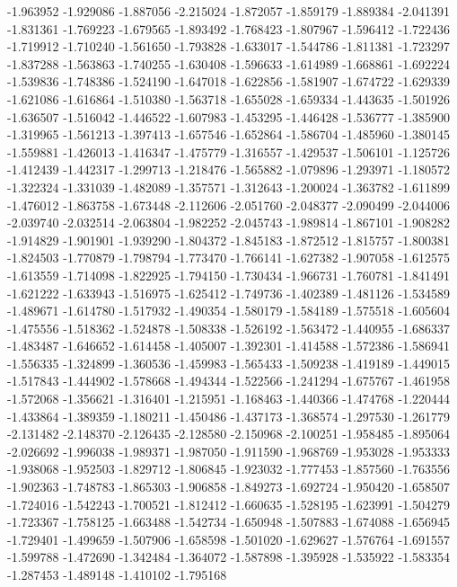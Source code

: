 -1.963952
-1.929086
-1.887056
-2.215024
-1.872057
-1.859179
-1.889384
-2.041391
-1.831361
-1.769223
-1.679565
-1.893492
-1.768423
-1.807967
-1.596412
-1.722436
-1.719912
-1.710240
-1.561650
-1.793828
-1.633017
-1.544786
-1.811381
-1.723297
-1.837288
-1.563863
-1.740255
-1.630408
-1.596633
-1.614989
-1.668861
-1.692224
-1.539836
-1.748386
-1.524190
-1.647018
-1.622856
-1.581907
-1.674722
-1.629339
-1.621086
-1.616864
-1.510380
-1.563718
-1.655028
-1.659334
-1.443635
-1.501926
-1.636507
-1.516042
-1.446522
-1.607983
-1.453295
-1.446428
-1.536777
-1.385900
-1.319965
-1.561213
-1.397413
-1.657546
-1.652864
-1.586704
-1.485960
-1.380145
-1.559881
-1.426013
-1.416347
-1.475779
-1.316557
-1.429537
-1.506101
-1.125726
-1.412439
-1.442317
-1.299713
-1.218476
-1.565882
-1.079896
-1.293971
-1.180572
-1.322324
-1.331039
-1.482089
-1.357571
-1.312643
-1.200024
-1.363782
-1.611899
-1.476012
-1.863758
-1.673448
-2.112606
-2.051760
-2.048377
-2.090499
-2.044006
-2.039740
-2.032514
-2.063804
-1.982252
-2.045743
-1.989814
-1.867101
-1.908282
-1.914829
-1.901901
-1.939290
-1.804372
-1.845183
-1.872512
-1.815757
-1.800381
-1.824503
-1.770879
-1.798794
-1.773470
-1.766141
-1.627382
-1.907058
-1.612575
-1.613559
-1.714098
-1.822925
-1.794150
-1.730434
-1.966731
-1.760781
-1.841491
-1.621222
-1.633943
-1.516975
-1.625412
-1.749736
-1.402389
-1.481126
-1.534589
-1.489671
-1.614780
-1.517932
-1.490354
-1.580179
-1.584189
-1.575518
-1.605604
-1.475556
-1.518362
-1.524878
-1.508338
-1.526192
-1.563472
-1.440955
-1.686337
-1.483487
-1.646652
-1.614458
-1.405007
-1.392301
-1.414588
-1.572386
-1.586941
-1.556335
-1.324899
-1.360536
-1.459983
-1.565433
-1.509238
-1.419189
-1.449015
-1.517843
-1.444902
-1.578668
-1.494344
-1.522566
-1.241294
-1.675767
-1.461958
-1.572068
-1.356621
-1.316401
-1.215951
-1.168463
-1.440366
-1.474768
-1.220444
-1.433864
-1.389359
-1.180211
-1.450486
-1.437173
-1.368574
-1.297530
-1.261779
-2.131482
-2.148370
-2.126435
-2.128580
-2.150968
-2.100251
-1.958485
-1.895064
-2.026692
-1.996038
-1.989371
-1.987050
-1.911590
-1.968769
-1.953028
-1.953333
-1.938068
-1.952503
-1.829712
-1.806845
-1.923032
-1.777453
-1.857560
-1.763556
-1.902363
-1.748783
-1.865303
-1.906858
-1.849273
-1.692724
-1.950420
-1.658507
-1.724016
-1.542243
-1.700521
-1.812412
-1.660635
-1.528195
-1.623991
-1.504279
-1.723367
-1.758125
-1.663488
-1.542734
-1.650948
-1.507883
-1.674088
-1.656945
-1.729401
-1.499659
-1.507906
-1.658598
-1.501020
-1.629627
-1.576764
-1.691557
-1.599788
-1.472690
-1.342484
-1.364072
-1.587898
-1.395928
-1.535922
-1.583354
-1.287453
-1.489148
-1.410102
-1.795168
